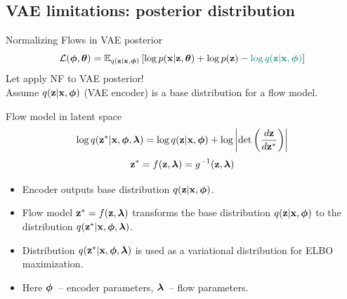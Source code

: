 \subsection{VAE limitations: posterior distribution}
\begin{frame}{Normalizing Flows in VAE posterior}
		\vspace{-0.3cm}
		\[
			\mathcal{L}(\boldsymbol{\phi}, \boldsymbol{\theta}) = \mathbb{E}_{q(\mathbf{z} | \mathbf{x}, \boldsymbol{\phi})} \left[ \log p(\mathbf{x} | \mathbf{z}, \boldsymbol{\theta}) + \log p(\mathbf{z}) - {\color{teal}\log q(\mathbf{z} | \mathbf{x}, \boldsymbol{\phi})} \right]
		\]
	Let apply NF to VAE posterior! \\ 
	Assume $q(\mathbf{z} | \mathbf{x}, \boldsymbol{\phi})$ (VAE encoder) is a base distribution for a flow model.
	\begin{block}{Flow model in latent space}
		\vspace{-0.5cm}
		\[
		\log q(\mathbf{z}^* | \mathbf{x}, \boldsymbol{\phi}, \boldsymbol{\lambda}) = \log q(\mathbf{z} | \mathbf{x}, \boldsymbol{\phi}) + \log \left | \det \left( \frac{d \mathbf{z}}{d \mathbf{z}^*}\right) \right|
		\]
		\vspace{-0.3cm}
		\[
		\mathbf{z}^* = f(\mathbf{z}, \boldsymbol{\lambda}) = g^{-1}(\mathbf{z}, \boldsymbol{\lambda})
		\]
		\vspace{-0.7cm}
	\end{block}
	\begin{itemize}
		\item Encoder outputs base distribution $q(\mathbf{z} | \mathbf{x}, \boldsymbol{\phi})$.
		\item Flow model $\mathbf{z}^* = f(\mathbf{z}, \boldsymbol{\lambda})$ transforms the base distribution $q(\mathbf{z} | \mathbf{x}, \boldsymbol{\phi})$ to the distribution $q(\mathbf{z}^* | \mathbf{x}, \boldsymbol{\phi}, \boldsymbol{\lambda})$.
		\item Distribution $q(\mathbf{z}^* | \mathbf{x}, \boldsymbol{\phi}, \boldsymbol{\lambda})$ is used as a variational distribution for ELBO maximization. 
		\item Here $\boldsymbol{\phi}$~-- encoder parameters, $\boldsymbol{\lambda}$~-- flow parameters.
	\end{itemize}
\end{frame}
